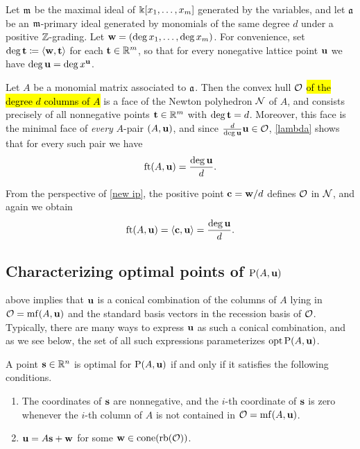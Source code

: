 \documentclass{amsart}
\begin{document}
\begin{example}
   \label{ex: m-primary homogeneous case}
   Let $\mathfrak{m}$ be the maximal ideal of  $\Bbbk[x_1,\ldots,x_m]$ generated by the variables, and let $\mathfrak{a}$ be an $\mathfrak{m}$-primary ideal generated by monomials of the same degree $d$ under a positive $\mathbb{Z}$-grading.
   Let $\mathbf{w} = (\deg x_1,\ldots,\deg x_m)$.
   For convenience, set $\deg \mathbf{t} \coloneqq \langle \mathbf{w}, \mathbf{t} \rangle$ for each $\mathbf{t} \in \mathbb{R}^m$, so that for every nonegative lattice point $\mathbf{u}$ we have $\deg \mathbf{u} = \deg x^{\mathbf{u}}$.

   Let $A$ be a monomial matrix associated to $\mathfrak{a}$.
   Then the convex hull $\mathcal{O}$ \hl{of the degree $d$ columns of $A$}
   is a face of the Newton polyhedron $\mathcal{N}$ of $A$, and consists precisely of all nonnegative points $\mathbf{t} \in \mathbb{R}^m$ with $\deg \mathbf{t}  = d$.
   Moreover, this face is the minimal face of \emph{every} $A$-pair $(A,\mathbf{u})$, and since $\frac d{\deg \mathbf{u}}\mathbf{u} \in \mathcal{O}$, \ref{lambda} shows that for every such pair we have
   \[
      \operatorname{ft}(A, \mathbf{u}) = \frac{\deg \mathbf{u}}{d}.
   \]

   From the perspective of \ref{new ip}, the positive point $\mathbf{c} = \mathbf{w}/d$ defines $\mathcal{O}$ in $\mathcal{N}$, and again we obtain
   \[
      \operatorname{ft}(A, \mathbf{u}) = \langle \mathbf{c}, \mathbf{u} \rangle = \frac{\deg \mathbf{u}}{d}.
   \]
\end{example}

\subsection{Characterizing optimal points of $\mathrm{P}(A,\mathbf{u})$}

 above implies that $\mathbf{u}$ is a conical combination of the columns of $A$ lying in $\mathcal{O} = \operatorname{mf}(A,\mathbf{u})$ and the standard basis vectors in the recession basis of $\mathcal{O}$.
Typically, there are many ways to express $\mathbf{u}$ as such a conical combination, and as we see below, the set of all such expressions parameterizes  $\operatorname{opt} \mathrm{P}(A, \mathbf{u})$.

\begin{proposition}\label{opt set: P}
   A point $\mathbf{s} \in \mathbb{R}^n$ is optimal for $\mathrm{P}(A, \mathbf{u})$ if and only if it satisfies the following conditions.
\begin{enumerate}[$(1)$]
\item  \label{mc coords: e} The coordinates of $\mathbf{s}$ are nonnegative, and the $i$-th coordinate of $\mathbf{s}$ is zero whenever the $i$-th column of $A$ is not contained in $\mathcal{O} = \operatorname{mf}(A, \mathbf{u})$.
\item  \label{mc decomposition: e} $\mathbf{u} = A \mathbf{s} + \mathbf{w}$ for some $\mathbf{w} \in  \operatorname{cone}(\operatorname{rb}(\mathcal{O}))$.
\end{enumerate}
\end{proposition}
\end{document}
